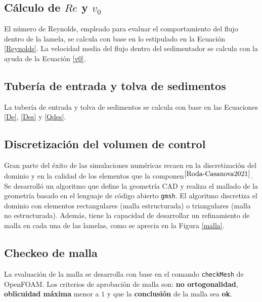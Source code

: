 \subsection{C\'alculo de $Re$ y $v_0$} \label{Rev0}

\noindent
\justify

El n\'umero de Reynolds, empleado para evaluar el comportamiento del flujo dentro de la lamela, se calcula con base en lo estipulado en la Ecuaci\'on \ref{Reynolds}. La velocidad media del flujo dentro del sedimentador se calcula con la ayuda de la Ecuaci\'on \ref{v0}.

\subsection{Tuber\'ia de entrada y tolva de sedimentos} \label{enTol}

\noindent
\justify

La tuber\'ia de entrada y tolva de sedimentos se calcula con base en las Ecuaciones \ref{De}, \ref{Des} y \ref{Qdes}.

\subsection{Discretizaci\'on del volumen de control}

\noindent
\justify

Gran parte del \'exito de las simulaciones num\'ericas recaen en la discretizaci\'on del dominio y en la calidad de los elementos que la componen$^{\cite{Roda-Casanova2021}}$. Se desarroll\'o un algoritmo que define la geometr\'ia CAD y realiza el mallado de la geometr\'ia basado en el lenguaje de c\'odigo abierto \texttt{gmsh}. El algoritmo discretiza el dominio con elementos rectangulares (malla estructurada) o triangulares (malla no estructurada). Adem\'as, tiene la capacidad de desarrollar un refinamiento de malla en cada una de las lamelas, como se aprecia en la Figura \ref{malla}.

\subsection{Checkeo de malla}

\noindent
\justify

La evaluaci\'on de la malla se desarrolla con base en el comando \texttt{checkMesh} de OpenFOAM. Los criterios de aprobaci\'on de malla son: \textbf{no ortogonalidad}, \textbf{oblicuidad m\'axima} menor a $1$ y que la \textbf{conclusi\'on} de la malla sea \textbf{ok}.

